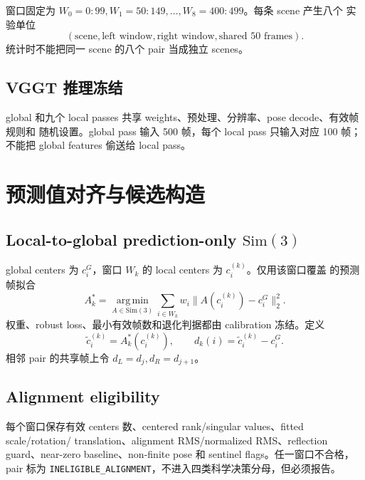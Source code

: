 \documentclass[UTF8,a4paper,11pt]{ctexart}
\newcommand{\Sim}{\mathrm{Sim}}
\newcommand{\argminop}{\operatorname*{arg\,min}}
\begin{document}
窗口固定为 $W_0=0{:}99,W_1=50{:}149,\ldots,W_8=400{:}499$。每条 scene 产生八个
实验单位
\begin{equation}
  (\text{scene},\text{left window},\text{right window},\text{shared 50 frames}).
\end{equation}
统计时不能把同一 scene 的八个 pair 当成独立 scenes。

\subsection{VGGT 推理冻结}

global 和九个 local passes 共享 weights、预处理、分辨率、pose decode、有效帧规则和
随机设置。global pass 输入 500 帧，每个 local pass 只输入对应 100 帧；不能把 global
features 偷送给 local pass。

\section{预测值对齐与候选构造}

\subsection{Local-to-global prediction-only $\Sim(3)$}

global centers 为 $c_i^G$，窗口 $W_k$ 的 local centers 为 $c_i^{(k)}$。仅用该窗口覆盖
的预测帧拟合
\begin{equation}
  A_k^*=\argminop_{A\in\Sim(3)}
  \sum_{i\in W_k}w_i\|A(c_i^{(k)})-c_i^G\|_2^2.
  \label{eq:local-global-align}
\end{equation}
权重、robust loss、最小有效帧数和退化判据都由 calibration 冻结。定义
\begin{equation}
  \widetilde c_i^{(k)}=A_k^*(c_i^{(k)}),\qquad
  d_k(i)=\widetilde c_i^{(k)}-c_i^G.
  \label{eq:candidate-residual}
\end{equation}
相邻 pair 的共享帧上令 $d_L=d_j,d_R=d_{j+1}$。

\subsection{Alignment eligibility}

每个窗口保存有效 centers 数、centered rank/singular values、fitted scale/rotation/
translation、alignment RMS/normalized RMS、reflection guard、near-zero baseline、non-finite
pose 和 sentinel flags。任一窗口不合格，pair 标为
\texttt{INELIGIBLE\_ALIGNMENT}，不进入四类科学决策分母，但必须报告。
\end{document}
